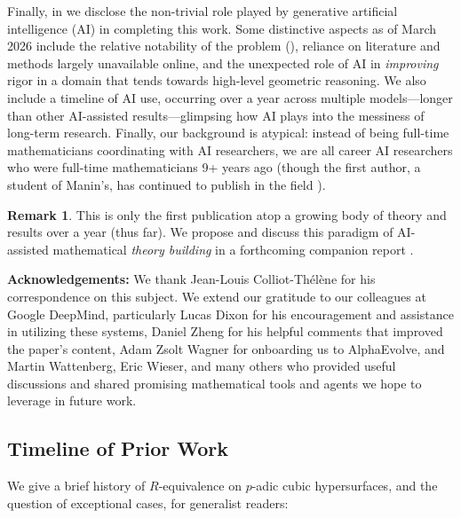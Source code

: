 \documentclass[11pt]{article}
\theoremstyle{definition}
\newtheorem{remark}[theorem]{Remark}
\begin{document}
\begin{ai}
Finally, in  we disclose the non-trivial role played by generative artificial intelligence (AI) in completing this work. Some distinctive aspects as of March 2026 include the relative notability of the problem (), reliance on literature and methods largely unavailable online, and the unexpected role of AI in \textit{improving} rigor in a domain that tends towards high-level geometric reasoning. We also include a timeline of AI use, occurring over a year across multiple models---longer than other AI-assisted results---glimpsing how AI plays into the messiness of long-term research. Finally, our background is atypical: instead of being full-time mathematicians coordinating with AI researchers, we are all career AI researchers who were full-time mathematicians 9+ years ago (though the first author, a student of Manin's, has continued to publish in the field \cite{dknonassoc, dknonassoc2}).

\begin{remark}
This is only the first publication atop a growing body of theory and results over a year (thus far). We propose and discuss this paradigm of AI-assisted mathematical \textit{theory building} in a forthcoming companion report \cite{aireport}.
\end{remark}

\noindent \textbf{Acknowledgements:} We thank Jean-Louis Colliot-Thélène for his correspondence on this subject. We extend our gratitude to our colleagues at Google DeepMind, particularly Lucas Dixon for his encouragement and assistance in utilizing these systems, Daniel Zheng for his helpful comments that improved the paper's content, Adam Zsolt Wagner for onboarding us to AlphaEvolve, and Martin Wattenberg, Eric Wieser, and many others who provided useful discussions and shared promising mathematical tools and agents we hope to leverage in future work.
\end{ai}

\subsection{Timeline of Prior Work}
\label{sec:timeline}
We give a brief history of $R$-equivalence on $p$-adic cubic hypersurfaces, and the question of exceptional cases, for generalist readers:
\end{document}
